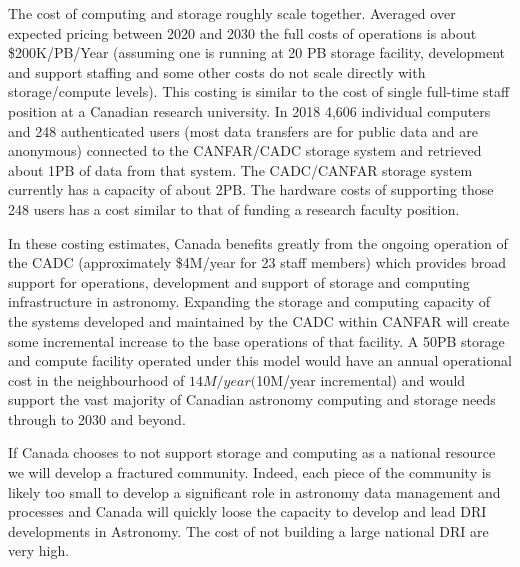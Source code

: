 \documentclass[11pt]{article}
\begin{document}
\begin{lrptextbox} 

The cost of computing and storage roughly scale together.   Averaged over expected pricing between 2020 and 2030 the full costs of operations is about \$200K/PB/Year (assuming one is running at 20 PB storage facility,  development and support staffing and some other costs do not scale directly with storage/compute levels). This costing is similar to the cost of single full-time staff position at a Canadian research university.  In 2018 4,606 individual computers and 248 authenticated users (most data transfers are for public data and are anonymous) connected to the CANFAR/CADC storage system and retrieved about 1PB of data from that system.  The CADC/CANFAR  storage system currently has a capacity of about 2PB.  The hardware costs of supporting those 248 users has a cost similar to that of funding a research faculty position.  

In these costing estimates, Canada benefits greatly from the ongoing operation of the CADC (approximately \$4M/year for 23 staff members) which provides broad support for operations, development and support of storage and computing infrastructure in astronomy.   Expanding the storage and computing capacity of the systems developed and maintained by the CADC within CANFAR will create some incremental increase to the base operations of that facility.   A 50PB storage and compute facility operated under this model would have an annual operational cost in the neighbourhood of $14M/year ($10M/year incremental) and would support the vast majority of Canadian astronomy computing and storage needs through to 2030 and beyond.  

If Canada chooses to not support storage and computing as a national resource we will develop a fractured community.  Indeed, each piece of the community is likely too small to develop a significant role in astronomy data management and processes and Canada will quickly loose the capacity to develop and lead DRI developments in Astronomy.  The cost of not building a large national DRI are very high.

\end{lrptextbox}
\end{document}
